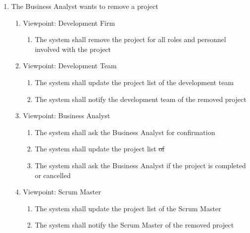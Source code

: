 \documentclass[12pt, titlepage]{article}
\begin{document}
\begin{enumerate}[{BE}1.]
	\item The Business Analyst wants to remove a project
	\begin{enumerate}[{VP}1.] 
	    \item Viewpoint: Development Firm
	        \begin{enumerate}
	            \item The system shall remove the project for all roles and personnel involved with the project
	        \end{enumerate}
	    \item Viewpoint: Development Team
	        \begin{enumerate}
	            \item The system shall update the project list of the development team
	            \item The system shall notify the development team of the removed project
	        \end{enumerate}
		\item Viewpoint: Business Analyst
			\begin{enumerate}
			    \item The system shall ask the Business Analyst for confirmation
			    \item The system shall update the project list \sout{of}
			    \item The system shall ask the Business Analyst if the project is completed or cancelled
			\end{enumerate}
		\item Viewpoint: Scrum Master
			\begin{enumerate}
	            \item The system shall update the project list of the Scrum Master
	            \item The system shall notify the Scrum Master of the removed project
			\end{enumerate}
	\end{enumerate}
	

\end{enumerate}
\end{document}
